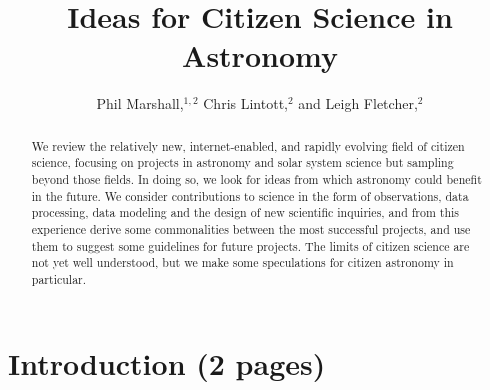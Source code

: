 \documentclass{ar2e}
\begin{document}

\jvol{}
\ARinfo{}

\title{Ideas for Citizen Science in Astronomy}

\author{Phil Marshall,$^{1,2}$
Chris Lintott,$^{2}$ and
Leigh Fletcher,$^{2}$
}




\begin{abstract} 

We review the relatively new, internet-enabled, and rapidly evolving field of
citizen science, focusing on projects in astronomy and solar system science but
sampling beyond those fields. In doing so, we look for  ideas from which
astronomy  could benefit in the future. We consider contributions to science in
the form of observations, data processing, data modeling and the design of new
scientific inquiries, and from this experience derive some commonalities between
the most successful projects, and use them to suggest some guidelines for future
projects. The limits of citizen science are not yet well understood, but we make
some speculations for citizen astronomy in particular.


\end{abstract}

\maketitle


\section{Introduction (2 pages)}
\label{sec:intro}
\end{document}
